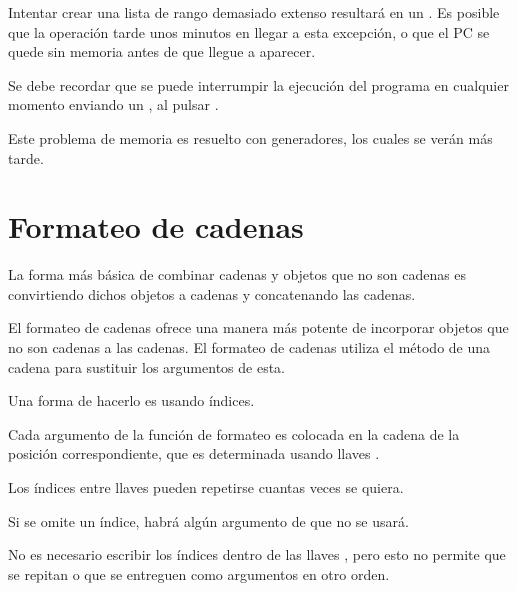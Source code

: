 Intentar crear una lista de rango demasiado extenso resultará en un . Es posible que la operación tarde unos minutos en llegar a esta excepción, o que el PC se quede sin memoria antes de que llegue a aparecer.


Se debe recordar que se puede interrumpir la ejecución del programa en cualquier momento enviando un , al pulsar .\smallskip

Este problema de memoria es resuelto con generadores, los cuales se verán más tarde.

\section{Formateo de cadenas}

La forma más básica de combinar cadenas y objetos que no son cadenas es convirtiendo dichos objetos a cadenas y concatenando las cadenas.\smallskip

El formateo de cadenas ofrece una manera más potente de incorporar objetos que no son cadenas a las cadenas. El formateo de cadenas utiliza el método  de una cadena para sustituir los argumentos de esta.\smallskip

Una forma de hacerlo es usando índices.


Cada argumento de la función de formateo es colocada en la cadena de la posición correspondiente, que es determinada usando llaves \ttt{\{\}}.\smallskip

Los índices entre llaves \ttt{\{\}} pueden repetirse cuantas veces se quiera.


Si se omite un índice, habrá algún argumento de  que no se usará.


No es necesario escribir los índices dentro de las llaves \ttt{\{\}}, pero esto no permite que se repitan o que se entreguen como argumentos en otro orden.


